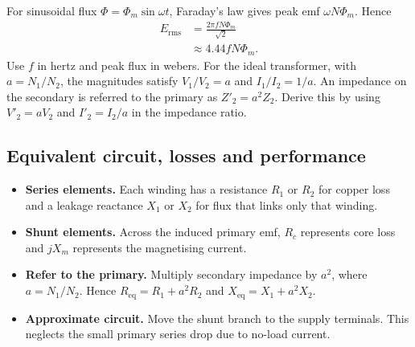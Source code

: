\documentclass[12pt,a4paper]{article}
\begin{document}
\begin{tcolorbox}[tikzbox,title={Windings and shared magnetic flux},unbreakable]
\centering
{}
\end{tcolorbox}

For sinusoidal flux \(\Phi=\Phi_m\sin\omega t\), Faraday's law gives peak emf \(\omega N\Phi_m\). Hence
\[
\begin{aligned}
E_{\mathrm{rms}}&=\frac{2\pi fN\Phi_m}{\sqrt 2}\\
                &\approx 4.44 fN\Phi_m .
\end{aligned}
\]
Use \(f\) in hertz and peak flux in webers. For the ideal transformer, with \(a=N_1/N_2\), the magnitudes satisfy \(V_1/V_2=a\) and \(I_1/I_2=1/a\). An impedance on the secondary is referred to the primary as \(Z'_2=a^2Z_2\). Derive this by using \(V'_2=aV_2\) and \(I'_2=I_2/a\) in the impedance ratio.

\subsection{Equivalent circuit, losses and performance}
\begin{itemize}[leftmargin=*, itemsep=3pt, topsep=4pt]
  \item \textbf{Series elements.} Each winding has a resistance \(R_1\) or \(R_2\) for copper loss and a leakage reactance \(X_1\) or \(X_2\) for flux that links only that winding.
  \item \textbf{Shunt elements.} Across the induced primary emf, \(R_c\) represents core loss and \(jX_m\) represents the magnetising current.
  \item \textbf{Refer to the primary.} Multiply secondary impedance by \(a^2\), where \(a=N_1/N_2\). Hence \(R_{\mathrm{eq}}=R_1+a^2R_2\) and \(X_{\mathrm{eq}}=X_1+a^2X_2\).
  \item \textbf{Approximate circuit.} Move the shunt branch to the supply terminals. This neglects the small primary series drop due to no-load current.
\end{itemize}
\end{document}
